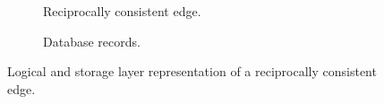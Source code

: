 \begin{figure}[htp]
  \centering
  \begin{subfigure}{\linewidth}
    \centering
    
    \caption{Reciprocally consistent edge.}
    \label{rc-edge}
  \end{subfigure}
  \begin{subfigure}{\linewidth}
    \vspace{2ex}
    \centering
    
    \caption{Database records.}
    \label{db-rep}
  \end{subfigure}%
  \caption{Logical and storage layer representation of a reciprocally consistent edge.}
  \label{rc}
\end{figure}